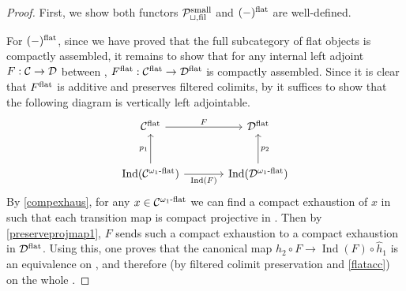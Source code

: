 \documentclass[a4paper,10pt, oneside]{amsart}
\begin{document}
	\begin{proof}
		First, we show both functors $\mathcal{P}_{\sqcup,\mathrm{fil}}^{\mathrm{small}}$ and $(-)^{\mathrm{flat}}$ are well-defined. 
		
		For $(-)^{\mathrm{flat}}$, since we have proved that the full subcategory of flat objects is compactly assembled, it remains to show that for any internal left adjoint $F:\mathcal{C}\to\mathcal{D}$ between \dualaddinfcats, $F^{\mathrm{flat}}:\mathcal{C}^{\mathrm{flat}}\to \mathcal{D}^{\mathrm{flat}}$ is compactly assembled. Since it is clear that $F^{\mathrm{flat}}$ is additive and preserves filtered colimits, by \cite[Corollary 2.43]{ramzi2024dualizable} it suffices to show that the following diagram is vertically left adjointable.
		$$%
		\begin{tikzcd}[row sep=large, column sep=large]
			\mathcal{C}^{\op{flat}} \arrow[r, "F"]                                                            & \mathcal{D}^{\op{flat}}                                              \\
			\mathrm{Ind}(\mathcal{C}^{\omega_1\text{-}{\op{flat}}}) \arrow[u, "p_{1}"] \arrow[r, "\mathrm{Ind}(F)"'] & \mathrm{Ind}(\mathcal{D}^{\omega_1\text{-}{\op{flat}}}) \arrow[u, "p_{2}"']
		\end{tikzcd}$$
		By \cref{compexhaus}, for any $x\in\mathcal{C}^{\omega_1\text{-}\mathrm{flat}}$ we can find a compact exhaustion of $x$ in \cflat such that each transition map is compact projective in \mcc.  Then by \cref{preserveprojmap1}, $F$ sends such a compact exhaustion to a compact exhaustion in $\mathcal{D}^{{\mathrm{flat}}}$. Using this, one proves that the canonical map $\hat{h}_{2} \circ F \rightarrow \operatorname{Ind}(F) \circ \hat{h}_{1}$ is an equivalence on \cflatw, and therefore (by filtered colimit preservation and \cref{flatacc}) on the whole \cflat.
		

\end{proof}
\end{document}
